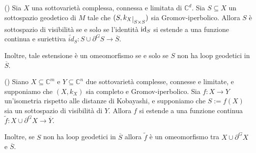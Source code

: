\begin{thm}
    (\cite[Theorem 1.4]{CMS}) Sia $X$ una sottovarietà complessa, connessa e limitata di $\mathbb{C}^d$. Sia $S\subseteq X$ un sottospazio geodetico di $M$ tale che $(S,k_X\restrict{S\times S})$ sia Gromov-iperbolico. Allora $S$ è sottospazio di visibilità se e solo se l'identità $\operatorname{id}_S$ si estende a una funzione continua e suriettiva $\tilde{id}_S:S\cup\partial^GS\longrightarrow\overline{S}$.

    Inoltre, tale estensione è un omeomorfismo se e solo se $S$ non ha loop geodetici in $\overline{S}$.
\end{thm}

\begin{thm}
    (\cite[Theorem 1.5]{CMS}) Siano $X\subseteq\mathbb{C}^m$ e $Y\subseteq\mathbb{C}^n$ due sottovarietà complesse, connesse e limitate, e supponiamo che $(X,k_X)$ sia completo e Gromov-iperbolico. Sia $f:X\longrightarrow Y$ un'isometria rispetto alle distanze di Kobayashi, e supponiamo che $S:=f(X)$ sia un sottospazio di visibilità di $Y$. Allora $f$ si estende a una funzione continua $\tilde{f}:X\cup\partial^GX\longrightarrow\overline{Y}$.

    Inoltre, se $S$ non ha loop geodetici in $\overline{S}$ allora $\tilde{f}$ è un omeomorfismo tra $X\cup\partial^GX$ e $\overline{S}$.
\end{thm}